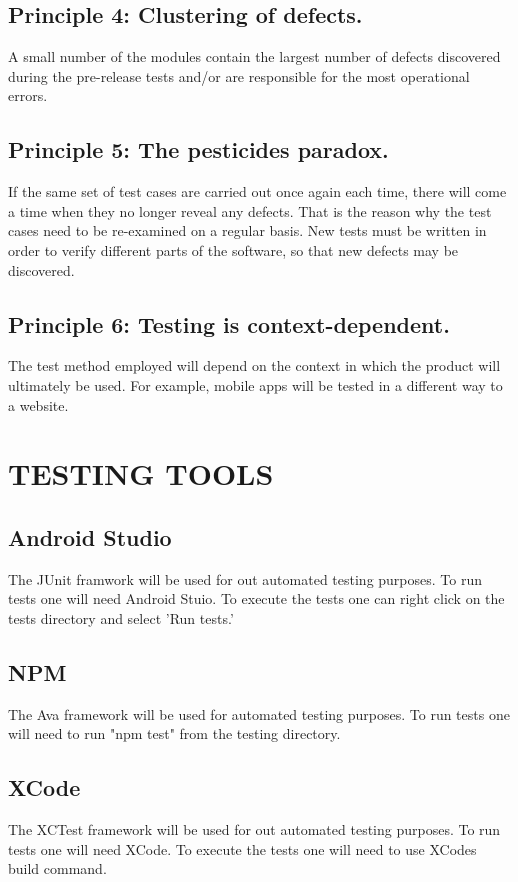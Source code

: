 \documentclass[12pt]{article}
\begin{document}
 \subsection{Principle 4: Clustering of defects. }
A small number of the modules contain the largest number of defects discovered during the pre-release tests and/or are responsible for the most operational errors. \newline
  \subsection{Principle 5: The pesticides paradox. }
If the same set of test cases are carried out once again each time, there will come a time when they no longer reveal any defects. That is the reason why the test cases need to be re-examined on a regular basis. New tests must be written in order to verify different parts of the software, so that new defects may be discovered. \newline
\subsection{Principle 6: Testing is context-dependent. }
The test method employed will depend on the context in which the product will ultimately be used. For example, mobile apps will be tested in a different way to a website. \newline

  \section{TESTING TOOLS}
  \subsection{Android Studio}
  The JUnit framwork will be used for out automated testing purposes. To run tests one will need Android Stuio. To execute the tests one can right click on the tests directory and select 'Run tests.'
  \subsection{NPM}
  The Ava framework will be used for automated testing purposes. To run tests one will need to run "npm test" from the testing directory.
  \subsection{XCode}
  The XCTest framework will be used for out automated testing purposes. To run tests one will need XCode. To execute the tests one will need to use XCodes build command.
  
\end{document}
